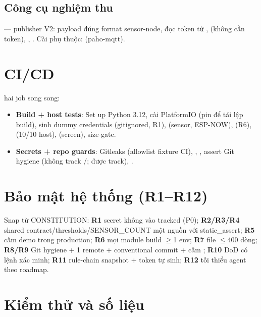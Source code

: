 \subsection{Công cụ nghiệm thu}
 — publisher V2: payload đúng format sensor-node, đọc
token từ ,  (không cần token), ,
. Cài phụ thuộc: 
(paho-mqtt).

\section{CI/CD}
\label{sec:sys-ci}

 hai job song song:
\begin{itemize}
\item \textbf{Build + host tests}: Set up Python 3.12, cài PlatformIO (pin
   để tái lập build), sinh dummy credentials (gitignored, R1),
   (sensor, ESP-NOW), 
  (R6),  (10/10 host),  (screen),
  size-gate.
\item \textbf{Secrets + repo guards}: Gitleaks (allowlist fixture CI),
  , , assert Git hygiene
  (không track /;  được track),
  .
\end{itemize}

\section{Bảo mật hệ thống (R1--R12)}
\label{sec:sys-security}

Snap từ CONSTITUTION: \textbf{R1} secret không vào tracked (P0); \textbf{R2/R3/R4} shared
contract/thresholds/SENSOR\_COUNT một nguồn với static\_assert; \textbf{R5} cấm demo trong
production; \textbf{R6} mọi module build $\geq$1 env; \textbf{R7} file $\leq$400 dòng;
\textbf{R8/R9} Git hygiene + 1 remote + conventional commit + cấm ;
\textbf{R10} DoD có lệnh xác minh; \textbf{R11} rule-chain snapshot + token tự sinh;
\textbf{R12} tối thiểu agent theo roadmap.

\section{Kiểm thử và số liệu}
\label{sec:sys-test}

